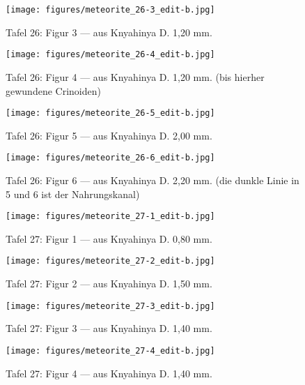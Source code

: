 \documentclass[a4paper, 11pt, oneside]{article}
\begin{document}
\clearpage
\begin{figure}[t]
\texttt{[image: figures/meteorite\_26-3\_edit-b.jpg]}
\caption{Tafel 26: Figur 3 --- aus Knyahinya D. 1,20 mm.}
\centering
\end{figure}
\clearpage
\begin{figure}[t]
\texttt{[image: figures/meteorite\_26-4\_edit-b.jpg]}
\caption{Tafel 26: Figur 4 --- aus Knyahinya D. 1,20 mm. (bis hierher gewundene Crinoiden)}
\centering
\end{figure}
\clearpage
\begin{figure}[t]
\texttt{[image: figures/meteorite\_26-5\_edit-b.jpg]}
\caption{Tafel 26: Figur 5 --- aus Knyahinya D. 2,00 mm.}
\centering
\end{figure}
\clearpage
\begin{figure}[t]
\texttt{[image: figures/meteorite\_26-6\_edit-b.jpg]}
\caption{Tafel 26: Figur 6 --- aus Knyahinya D. 2,20 mm. (die dunkle Linie in 5 und 6 ist der Nahrungskanal)}
\centering
\end{figure}
\clearpage
{}
\begin{figure}[t]
\texttt{[image: figures/meteorite\_27-1\_edit-b.jpg]}
\caption{Tafel 27: Figur 1 --- aus Knyahinya D. 0,80 mm.}
\centering
\end{figure}
\clearpage
\begin{figure}[t]
\texttt{[image: figures/meteorite\_27-2\_edit-b.jpg]}
\caption{Tafel 27: Figur 2 --- aus Knyahinya D. 1,50 mm.}
\centering
\end{figure}
\clearpage
\begin{figure}[t]
\texttt{[image: figures/meteorite\_27-3\_edit-b.jpg]}
\caption{Tafel 27: Figur 3 --- aus Knyahinya D. 1,40 mm.}
\centering
\end{figure}
\clearpage
\begin{figure}[t]
\texttt{[image: figures/meteorite\_27-4\_edit-b.jpg]}
\caption{Tafel 27: Figur 4 --- aus Knyahinya D. 1,40 mm.}
\centering
\end{figure}
\end{document}
